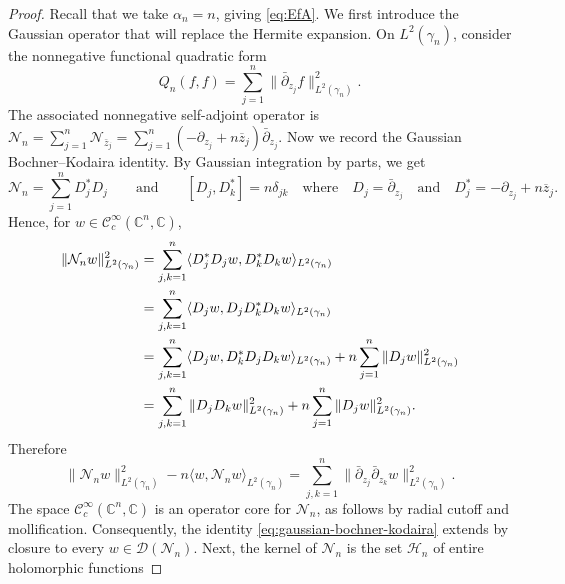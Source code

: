 \documentclass[11pt,reqno]{amsart}
\numberwithin{equation}{section}%
\numberwithin{figure}{section}%
\numberwithin{table}{section}
\theoremstyle{plain}
\theoremstyle{definition}
\begin{document}
\begin{proof}
  Recall that we take $\alpha_n=n$, giving \eqref{eq:EfA}. We first introduce
  the Gaussian operator that will replace the Hermite expansion. On
  $L^2(\gamma_n)$, consider the nonnegative functional quadratic form
  \begin{equation}\label{eq:gaussian-dbar-form}
    Q_n(f,f) = \sum_{j=1}^n \|\bar\partial_{z_j}f\|_{L^2(\gamma_n)}^2.
  \end{equation}
  The associated nonnegative self-adjoint operator is
  $\mathcal{N}_n=\sum_{j=1}^n\mathcal{N}_{\bar{z}_j}=\sum_{j=1}^n(-\partial_{z_j}+n\overline
  z_j)\bar\partial_{z_j}$. Now we record the Gaussian Bochner--Kodaira
  identity. By Gaussian integration by parts, we get
  \[
    \mathcal{N}_n=\sum_{j=1}^nD_j^*D_j
    \qquad\text{and}\qquad
    [D_j,D_k^*]=n\delta_{jk}
    \quad\text{where}\quad
    D_j=\bar\partial_{z_j}
    \quad\text{and}\quad
    D_j^*=-\partial_{z_j}+n\overline z_j.
  \]
  Hence, for
  $w\in\mathcal{C}_c^\infty(\mathbb{C}^n,\mathbb{C})$,
  \begin{align}
    \|\mathcal{N}_nw\|_{L^2(\gamma_n)}^2
    &=
    \sum_{j,k=1}^n
    \langle D_j^*D_jw,D_k^*D_kw\rangle_{L^2(\gamma_n)}
    \notag\\
    &=
    \sum_{j,k=1}^n
    \langle D_jw,D_jD_k^*D_kw\rangle_{L^2(\gamma_n)}
    \notag\\
    &=
    \sum_{j,k=1}^n
    \langle D_jw,D_k^*D_jD_kw\rangle_{L^2(\gamma_n)}
    +
    n\sum_{j=1}^n
    \|D_jw\|_{L^2(\gamma_n)}^2
    \notag\\
    &=
    \sum_{j,k=1}^n
    \|D_jD_kw\|_{L^2(\gamma_n)}^2
    +
    n\sum_{j=1}^n
    \|D_jw\|_{L^2(\gamma_n)}^2.
  \end{align}
  Therefore
  \begin{equation}\label{eq:gaussian-bochner-kodaira}
    \|\mathcal{N}_nw\|_{L^2(\gamma_n)}^2
    -
    n\langle w,\mathcal{N}_nw\rangle_{L^2(\gamma_n)}
    =
    \sum_{j,k=1}^n
    \|\bar\partial_{z_j}\bar\partial_{z_k}w\|_{L^2(\gamma_n)}^2.
  \end{equation}
  The space $\mathcal{C}_c^\infty(\mathbb{C}^n,\mathbb{C})$ is an operator
  core for $\mathcal{N}_n$, as follows by radial cutoff and mollification.
  Consequently, the identity \eqref{eq:gaussian-bochner-kodaira} extends by
  closure to every $w\in\mathcal{D}(\mathcal{N}_n)$. Next, the kernel of
  $\mathcal{N}_n$ is the set $\mathcal{H}_n$ of entire holomorphic functions

\end{proof}
\end{document}
